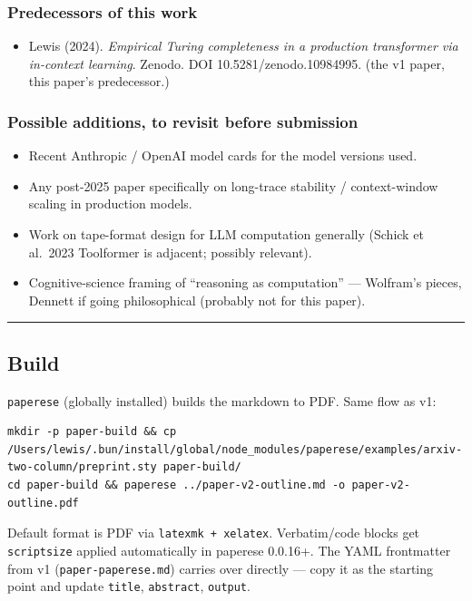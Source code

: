 \documentclass[twocolumn,switch,10pt]{article}
\providecommand{\tightlist}{\setlength{\itemsep}{0pt}\setlength{\parskip}{0pt}}
\begin{document}
\subsubsection{Predecessors of this work}\label{predecessors-of-this-work}

\begin{itemize}
\tightlist
\item
  Lewis (2024). \emph{Empirical Turing completeness in a production
  transformer via in-context learning}. Zenodo. DOI
  10.5281/zenodo.10984995. (the v1 paper, this paper's predecessor.)
\end{itemize}

\subsubsection{Possible additions, to revisit before submission}\label{possible-additions-to-revisit-before-submission}

\begin{itemize}
\tightlist
\item
  Recent Anthropic / OpenAI model cards for the model versions used.
\item
  Any post-2025 paper specifically on long-trace stability /
  context-window scaling in production models.
\item
  Work on tape-format design for LLM computation generally (Schick
  et al.~2023 Toolformer is adjacent; possibly relevant).
\item
  Cognitive-science framing of ``reasoning as computation'' --- Wolfram's
  pieces, Dennett if going philosophical (probably not for this
  paper).
\end{itemize}

\begin{center}\rule{0.5\linewidth}{0.5pt}\end{center}

\subsection{Build}\label{build}

\texttt{paperese} (globally installed) builds the markdown to PDF. Same
flow as v1:

\begin{verbatim}
mkdir -p paper-build && cp /Users/lewis/.bun/install/global/node_modules/paperese/examples/arxiv-two-column/preprint.sty paper-build/
cd paper-build && paperese ../paper-v2-outline.md -o paper-v2-outline.pdf
\end{verbatim}

Default format is PDF via \texttt{latexmk\ +\ xelatex}. Verbatim/code blocks
get \texttt{scriptsize} applied automatically in paperese 0.0.16+. The YAML
frontmatter from v1 (\texttt{paper-paperese.md}) carries over directly ---
copy it as the starting point and update \texttt{title}, \texttt{abstract},
\texttt{output}.
\end{document}
